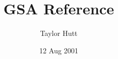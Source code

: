\documentclass[10pt]{book}
\title {GSA Reference}
\author{Taylor Hutt}
\date{12 Aug 2001}
\begin{document}

\maketitle
\tableofcontents
\listoffigures
\listoftables
\listofalgorithms









\end{document}
